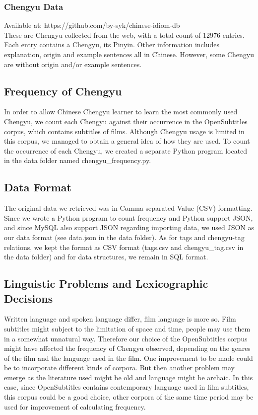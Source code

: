 \documentclass[11pt]{article} %
\begin{document}
\subsubsection{Chengyu Data}
Available at: https://github.com/by-syk/chinese-idiom-db\\
These are Chengyu collected from the web, with a total count of 12976 entries. Each entry contains a Chengyu, its Pinyin. Other information includes explanation, origin and example sentences all in Chinese. However, some Chengyu are without origin and/or example sentences.

\subsection{Frequency of Chengyu}
\indent In order to allow Chinese Chengyu learner to learn the most commonly used Chengyu, we count each Chengyu against their occurrence in the OpenSubtitles corpus, which contains subtitles of films. Although Chengyu usage is limited in this corpus, we managed to obtain a general idea of how they are used. To count the occurrence of each Chengyu, we created a separate Python program located in the data folder named chengyu\_frequency.py.

\subsection{Data Format}
\indent The original data we retrieved was in Comma-separated Value (CSV) formatting. Since we wrote a Python program to count frequency and Python support JSON, and since MySQL also support JSON regarding importing data, we used JSON as our data format (see data.json in the data folder). As for tags and chengyu-tag relations, we kept the format as CSV format (tags.csv and chengyu\_tag.csv in the data folder) and for data structures, we remain in SQL format.

\subsection{Linguistic Problems and Lexicographic Decisions}

\indent Written language and spoken language differ, film language is more so. Film subtitles might subject to the limitation of space and time, people may use them in a somewhat unnatural way. Therefore our choice of the OpenSubtitles corpus might have affected the frequency of Chengyu observed, depending on the genres of the film and the language used in the film. One improvement to be made could be to incorporate different kinds of corpora. But then another problem may emerge as the literature used might be old and language might be archaic. In this case, since OpenSubtitles contains contemporary language used in film subtitles, this corpus could be a good choice, other corpora of the same time period may be used for improvement of calculating frequency.\\
\end{document}

